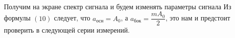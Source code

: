 \documentclass[a4paper, 12pt]{article}%
\begin{document}
\begin{figure}[h]
    \centering
    \\
        			
\end{figure}
Получим на экране спектр сигнала и будем изменять параметры сигнала
Из формулы $(10)$ следует, что $a_{\text{осн}} = A_0$, а $a_{\text{бок}} = \dfrac{mA_0}{2}$, это нам и предстоит проверить в следующей серии измерений.
\end{document}
